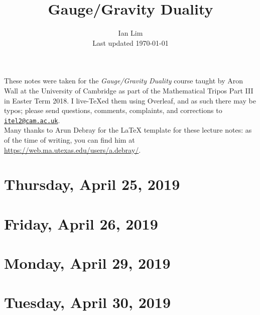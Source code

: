 \documentclass[reqno]{amsart}
\begin{document}
\title{Gauge/Gravity Duality}
\author{Ian Lim\\ Last updated \today}
\maketitle
{\small\noindent These notes were taken for the \textit{Gauge/Gravity Duality} course taught by Aron Wall at the University of Cambridge as part of the Mathematical Tripos Part III in Easter Term 2018. I live-\TeX ed them using Overleaf, and as such there may be typos; please send questions, comments, complaints, and corrections to 
\href{mailto:itel2@cam.ac.uk?subject=GGD\%20Lecture\%20Notes}{\texttt{itel2@cam.ac.uk}}.\\
Many thanks to Arun Debray for the {\LaTeX} template for these lecture notes: as of the time of writing, you can find him at \url{https://web.ma.utexas.edu/users/a.debray/}.}

\tableofcontents

\section{Thursday, April 25, 2019}
	
\section{Friday, April 26, 2019}
	
\section{Monday, April 29, 2019}
    
\section{Tuesday, April 30, 2019}
    
\end{document}
